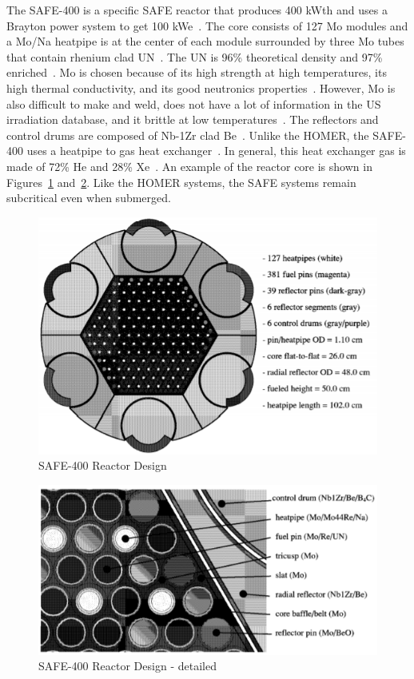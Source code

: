 \documentclass{article}
\begin{document}
    The SAFE-400 is a specific SAFE reactor that produces 400 kWth and uses a Brayton power system to get 100 kWe~\cite{poston2002design}. The core consists of 127 Mo modules and a Mo/Na heatpipe is at the center of each module surrounded by three Mo tubes that contain rhenium clad UN~\cite{poston2002design}. The UN is 96\% theoretical density and 97\% enriched~\cite{poston2002design}. Mo is chosen because of its high strength at high temperatures, its high thermal conductivity, and its good neutronics properties~\cite{poston2002design}. However, Mo is also difficult to make and weld, does not have a lot of information in the US irradiation database, and it brittle at low temperatures~\cite{poston2002design}. The reflectors and control drums are composed of Nb-1Zr clad Be~\cite{poston2002design}. Unlike the HOMER, the SAFE-400 uses a heatpipe to gas heat exchanger~\cite{poston2002design}. In general, this heat exchanger gas is made of 72\% He and 28\% Xe~\cite{webworldnuclear}. An example of the reactor core is shown in Figures~\ref{appR1} and~\ref{appR2}. Like the HOMER systems, the SAFE systems remain subcritical even when submerged.


\begin{figure}[]
	\centering
	\includegraphics[height=0.45\textheight]{fig/appR1}
	\caption[SAFE-400 Reactor Design]{SAFE-400 Reactor Design~\cite{poston2002design}}
	\label{appR1}
\end{figure}


\begin{figure}[]
	\centering
	\includegraphics[height=0.35\textheight]{fig/appR2}
	\caption[SAFE-400 Reactor Design - Detailed]{SAFE-400 Reactor Design - detailed~\cite{poston2002design}}
	\label{appR2}
\end{figure}
 
\end{document}
